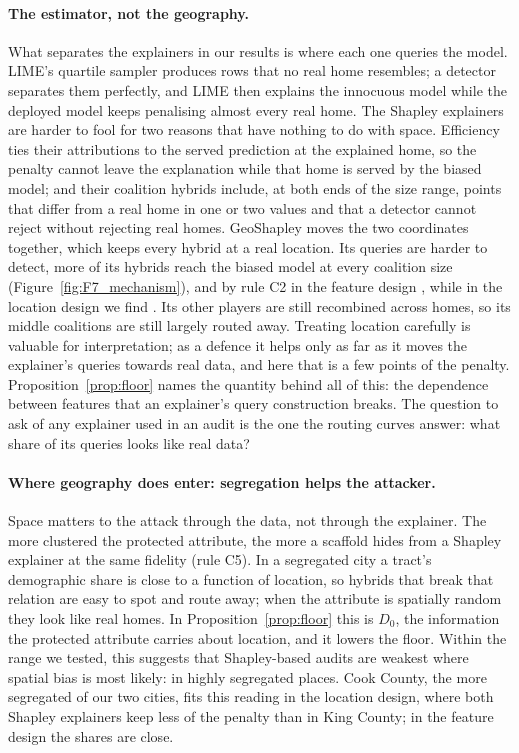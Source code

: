
\paragraph{The estimator, not the geography.} What separates the explainers in our results is where each one queries
the model. LIME's quartile sampler produces rows that no real home resembles; a detector separates them perfectly,
and LIME then explains the innocuous model while the deployed model keeps penalising almost every real home. The
Shapley explainers are harder to fool for two reasons that have nothing to do with space. Efficiency ties their
attributions to the served prediction at the explained home, so the penalty cannot leave the explanation while that
home is served by the biased model; and their coalition hybrids include, at both ends of the size range, points that
differ from a real home in one or two values and that a detector cannot reject without rejecting real homes.
GeoShapley moves the two coordinates together, which keeps every hybrid at a real location. Its queries are harder
to detect, more of its hybrids reach the biased model at every coalition size (Figure~\ref{fig:F7_mechanism}), and by
rule C2 in the feature design \FCtwoClause, while in the location design we find \LCtwoClause. Its other players are
still recombined across homes, so its middle coalitions are still largely routed away. Treating location carefully is
valuable for interpretation; as a defence it helps only as far as it moves the explainer's queries towards real data,
and here that is a few points of the penalty. Proposition~\ref{prop:floor} names the quantity behind all of this: the dependence between features that an
explainer's query construction breaks. The question to ask of any explainer used in an audit is the one the routing
curves answer: what share of its queries looks like real data?

\paragraph{Where geography does enter: segregation helps the attacker.} Space matters to the attack through the data,
not through the explainer. The more clustered the protected attribute, the more a scaffold hides from a Shapley
explainer at the same fidelity (rule C5). In a segregated city a tract's demographic share is close to a function of
location, so hybrids that break that relation are easy to spot and route away; when the attribute is spatially random
they look like real homes. In Proposition~\ref{prop:floor} this is $D_0$, the information the protected attribute
carries about location, and it lowers the floor. Within the range we tested, this suggests that Shapley-based audits are weakest where
spatial bias is most likely: in highly segregated places. Cook County, the more segregated of our two cities, fits
this reading in the location design, where both Shapley explainers keep less of the penalty than in King County;
in the feature design the shares are close.

